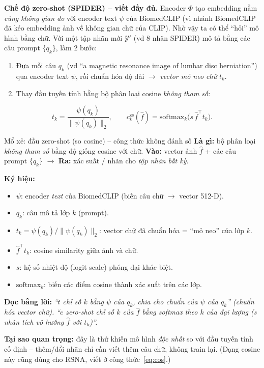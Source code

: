 \documentclass[12pt,a4paper]{article}
\begin{document}
\textbf{Chế độ zero-shot (SPIDER) -- viết đầy đủ.}
Encoder $\Phi$ tạo embedding nằm \emph{cùng không gian đo} với encoder text $\psi$ của BiomedCLIP (vì nhánh BiomedCLIP đã kéo embedding ảnh về không gian chữ của CLIP). Nhờ vậy ta có thể ``hỏi'' mô hình bằng chữ. Với một tập nhãn mới $\mathcal{Y}'$ (vd 8 nhãn SPIDER) mô tả bằng các câu prompt $\{q_k\}$, làm 2 bước:
\begin{enumerate}[leftmargin=1.6em,itemsep=1pt]
\item Đưa mỗi câu $q_k$ (vd ``a magnetic resonance image of lumbar disc herniation'') qua encoder text $\psi$, rồi chuẩn hóa độ dài $\to$ \emph{vector mỏ neo chữ} $t_k$.
\item Thay đầu tuyến tính bằng bộ phân loại cosine \emph{không tham số}:
\end{enumerate}
\[
t_k=\frac{\psi(q_k)}{\|\psi(q_k)\|_2},\qquad
c^{\text{zs}}_k(\hat f)=\mathrm{softmax}_k\!\big(s\,\hat f^{\top} t_k\big).
\]

\begin{ctbox}{Mổ xẻ: đầu zero-shot (so cosine) -- công thức không đánh số}
\textbf{Là gì:} bộ phân loại \emph{không tham số} bằng độ giống cosine với chữ. \quad\textbf{Vào:} vector ảnh $\hat f$ + các câu prompt $\{q_k\}$ $\to$ \textbf{Ra:} xác suất / nhãn cho \emph{tập nhãn bất kỳ}.

\textbf{Ký hiệu:}
\begin{itemize}[leftmargin=1.4em,itemsep=1pt]
\item $\psi$: encoder \emph{text} của BiomedCLIP (biến câu chữ $\to$ vector 512-D).
\item $q_k$: câu mô tả lớp $k$ (prompt).
\item $t_k=\psi(q_k)/\|\psi(q_k)\|_2$: vector chữ đã chuẩn hóa = ``mỏ neo'' của lớp $k$.
\item $\hat f^{\top}t_k$: cosine similarity giữa ảnh và chữ.
\item $s$: hệ số nhiệt độ (logit scale) phóng đại khác biệt.
\item $\mathrm{softmax}_k$: biến các điểm cosine thành xác suất trên các lớp.
\end{itemize}

\textbf{Đọc bằng lời:} \emph{``$t$ chỉ số $k$ bằng $\psi$ của $q_k$, chia cho chuẩn của $\psi$ của $q_k$'' (chuẩn hóa vector chữ). ``$c$ zero-shot chỉ số $k$ của $\hat f$ bằng softmax theo $k$ của đại lượng (s nhân tích vô hướng $\hat f$ với $t_k$)''.}

\textbf{Tại sao quan trọng:} đây là thứ khiến mô hình \emph{độc nhất} so với đầu tuyến tính cố định -- thêm/đổi nhãn chỉ cần viết thêm câu chữ, không train lại. (Dạng cosine này cũng dùng cho RSNA, viết ở công thức~\ref{eq:cos}.)
\end{ctbox}
\end{document}
